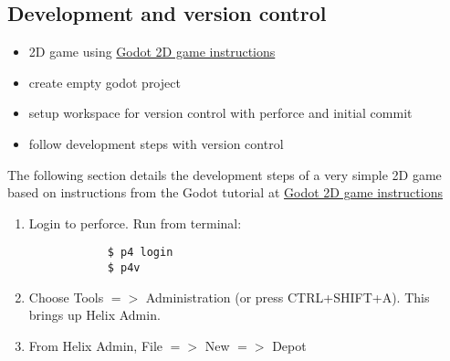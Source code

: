 \subsection{Development and version control}
\begin{itemize}
    \item 2D game using 
    \href{https://docs.godotengine.org/en/stable/getting_started/first_2d_game/index.html}{\color{blue}Godot 2D game instructions}
    \item create empty godot project
    \item setup workspace for version control with perforce and initial commit
    \item follow development steps with version control
\end{itemize}
The following section details the development steps of a very simple 2D game based on instructions from the Godot 
tutorial at \href{https://docs.godotengine.org/en/stable/getting_started/first_2d_game/index.html}{\color{blue}Godot 2D game instructions}
\begin{enumerate}
    \item Login to perforce. Run from terminal:
        \begin{verbatim}
            $ p4 login
            $ p4v
        \end{verbatim}
    \item Choose Tools {$=>$} Administration (or press CTRL+SHIFT+A). This brings up Helix Admin.
    \item From Helix Admin, File {$=>$} New {$=>$} Depot
\end{enumerate}